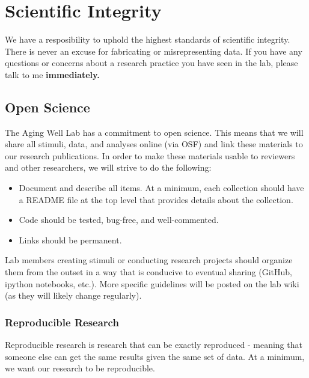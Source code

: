 \documentclass[]{book}
\providecommand{\tightlist}{%
  \setlength{\itemsep}{0pt}\setlength{\parskip}{0pt}}
\begin{document}
\hypertarget{scientific-integrity}{%
\chapter{Scientific Integrity}\label{scientific-integrity}}

We have a resposibility to uphold the highest standards of scientific integrity. There is never an excuse for fabricating or misrepresenting data. If you have any questions or concerns about a research practice you have seen in the lab, please talk to me \textbf{immediately.}

\hypertarget{open-science}{%
\section{Open Science}\label{open-science}}

The Aging Well Lab has a commitment to open science. This means that we will share all stimuli, data, and analyses online (via OSF) and link these materials to our research publications. In order to make these materials usable to reviewers and other researchers, we will strive to do the following:

\begin{itemize}
\tightlist
\item
  Document and describe all items. At a minimum, each collection should have a README file at the top level that provides details about the collection.\\
\item
  Code should be tested, bug-free, and well-commented.\\
\item
  Links should be permanent.
\end{itemize}

Lab members creating stimuli or conducting research projects should organize them from the outset in a way that is conducive to eventual sharing (GitHub, ipython notebooks, etc.). More specific guidelines will be posted on the lab wiki (as they will likely change regularly).

\hypertarget{reproducible-research}{%
\subsection{Reproducible Research}\label{reproducible-research}}

Reproducible research is research that can be exactly reproduced - meaning that someone else can get the same results given the same set of data. At a minimum, we want our research to be reproducible.
\end{document}
